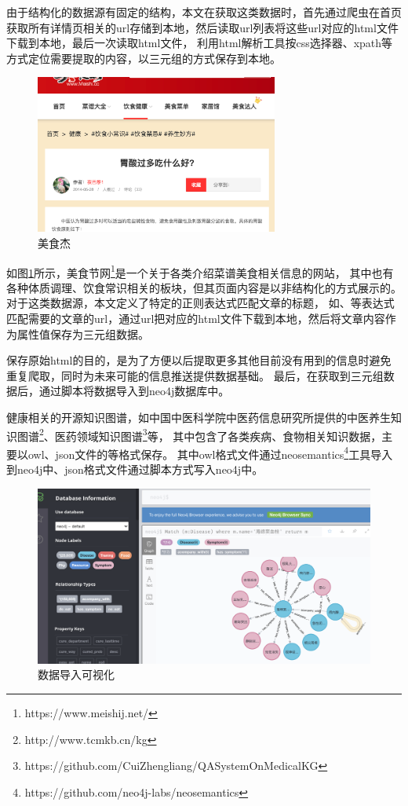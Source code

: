 由于结构化的数据源有固定的结构，本文在获取这类数据时，首先通过爬虫在首页获取所有详情页相关的url存储到本地，然后读取url列表将这些url对应的html文件下载到本地，最后一次读取html文件，
利用html解析工具按css选择器、xpath等方式定位需要提取的内容，以三元组的方式保存到本地。

\begin{figure}[h]
    \centering
    \includegraphics[width=8cm]{images/msj.png}
    \caption[]{美食杰}
    \label{fig:rel_source}
\end{figure}
如图\ref{fig:rel_source}所示，美食节网\footnote{https://www.meishij.net/}是一个关于各类介绍菜谱美食相关信息的网站，
其中也有各种体质调理、饮食常识相关的板块，但其页面内容是以非结构化的方式展示的。对于这类数据源，本文定义了特定的正则表达式匹配文章的标题，
如、等表达式匹配需要的文章的url，通过url把对应的html文件下载到本地，然后将文章内容作为属性值保存为三元组数据。

保存原始html的目的，是为了方便以后提取更多其他目前没有用到的信息时避免重复爬取，同时为未来可能的信息推送提供数据基础。
最后，在获取到三元组数据后，通过脚本将数据导入到neo4j数据库中。


健康相关的开源知识图谱，如中国中医科学院中医药信息研究所提供的中医养生知识图谱\footnote{http://www.tcmkb.cn/kg}、医药领域知识图谱\footnote{https://github.com/CuiZhengliang/QASystemOnMedicalKG}等，
其中包含了各类疾病、食物相关知识数据，主要以owl、json文件的等格式保存。
其中owl格式文件通过neosemantics\footnote{https://github.com/neo4j-labs/neosemantics}工具导入到neo4j中、json格式文件通过脚本方式写入neo4j中。

\begin{figure}[h]
    \centering
    \includegraphics[width=15cm]{images/brower.png}
    \caption[]{数据导入可视化}
    \label{fig:brower}
\end{figure}

